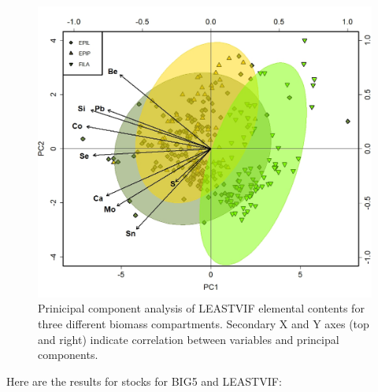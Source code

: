\documentclass[
]{article}
\begin{document}
\begin{figure}
\includegraphics[width=1\linewidth]{Figures/PCA_1_LEASTVIF} \caption[Prinicipal component analysis of LEASTVIF elemental contents for three different biomass compartments]{Prinicipal component analysis of LEASTVIF elemental contents for three different biomass compartments. Secondary X and Y axes (top and right) indicate correlation between variables and principal components.}\label{fig:unnamed-chunk-12}
\end{figure}

\FloatBarrier

\newpage

Here are the results for stocks for BIG5 and LEASTVIF:
\end{document}
